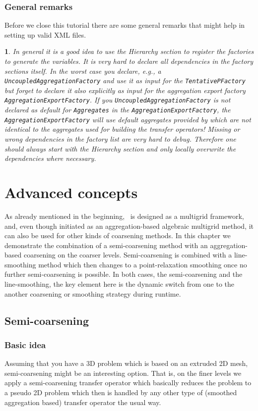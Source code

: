 \documentclass[10pt,fleqn]{book}
\newtheorem*{mycomment}{\ding{42}}
\begin{document}
\subsection{General remarks}
Before we close this tutorial there are some general remarks that might help in setting up valid XML files.
\begin{mycomment}
In general it is a good idea to use the \textit{Hierarchy} section to register the factories to generate the variables. It is very hard to declare all dependencies in the factory sections itself. In the worst case you declare, e.g., a \verb|UncoupledAggregationFactory| and use it as input for the \verb|TentativePFactory| but forget to declare it also explicitly as input for the aggregation export factory \verb|AggregationExportFactory|. If you \verb|UncoupledAggregationFactory| is not declared as default for \verb|Aggregates| in the \verb|AggregationExportFactory|, the \verb|AggregationExportFactory| will use default aggregates provided by \muelu which are not identical to the aggregates used for building the transfer operators! Missing or wrong dependencies in the factory list are very hard to debug. Therefore one should always start with the \textit{Hierarchy} section and only locally overwrite the dependencies where necessary.
\end{mycomment}

\chapter{Advanced concepts}

As already mentioned in the beginning, \muelu~is designed as a multigrid framework, and, even though initiated as an aggregation-based algebraic multigrid method, it can also be used for other kinds of coarsening methods. In this chapter we demonstrate the combination of a semi-coarsening method with an aggregation-based coarsening on the coarser levels. Semi-coarsening is combined with a line-smoothing method which then changes to a point-relaxation smoothing once no further semi-coarsening is possible. In both cases, the semi-coarsening and the line-smoothing, the key element here is the dynamic switch from one to the another coarsening or smoothing strategy during runtime.

\section{Semi-coarsening}

\subsection{Basic idea}
Assuming that you have a 3D problem which is based on an extruded 2D mesh, semi-coarsening might be an interesting option. That is, on the finer levels we apply a semi-coarsening transfer operator which basically reduces the problem to a pseudo 2D problem which then is handled by any other type of (smoothed aggregation based) transfer operator the usual way.
\end{document}
